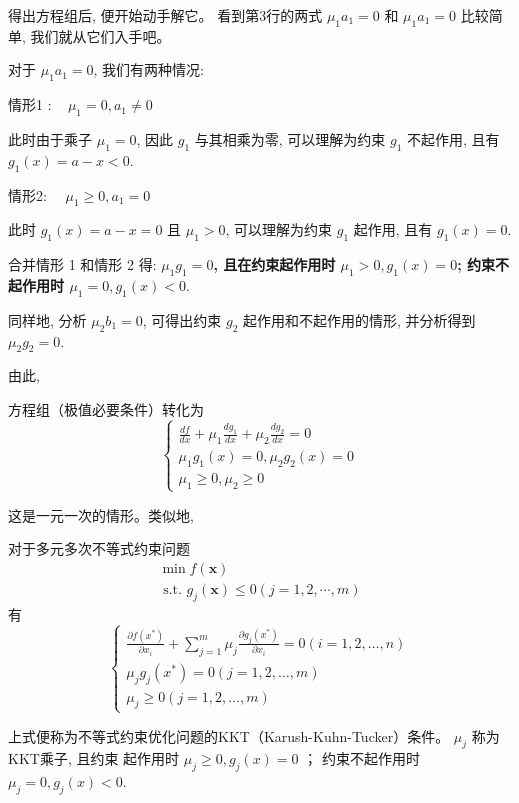 得出方程组后, 便开始动手解它。 看到第3行的两式 $\mu_{1} a_{1}=0$ 和 $\mu_{1} a_{1}=0$ 比较简单, 我们就从它们入手吧。

对于 $\mu_{1} a_{1}=0$, 我们有两种情况:

情形1 $: \quad \mu_{1}=0, a_{1} \neq 0$

此时由于乘子 $\mu_{1}=0$, 因此 $g_{1}$ 与其相乘为零, 可以理解为约束 $g_{1}$ 不起作用, 且有 $g_{1}(x)=a-x<0 .$

情形2: $\quad \mu_{1} \geq 0, a_{1}=0$

此时 $g_{1}(x)=a-x=0$ 且 $\mu_{1}>0$, 可以理解为约束 $g_{1}$ 起作用, 且有 $g_{1}(x)=0$.

合并情形 1 和情形 2 得: \textbf{$\mu_{1} g_{1}=0$, 且在约束起作用时 $\mu_{1}>0, g_{1}(x)=0$; 约束不起作用时 $\mu_{1}=0, g_{1}(x)<0 .$}

同样地, 分析 $\mu_{2} b_{1}=0$, 可得出约束 $g_{2}$ 起作用和不起作用的情形, 并分析得到 $\mu_{2} g_{2}=0$.

由此, 
\begin{theorem}[一元一次优化式的KKT条件]
    方程组（极值必要条件）转化为
$$
\left\{\begin{array}{l}
\frac{d f}{d x}+\mu_{1} \frac{d g_{1}}{d x}+\mu_{2} \frac{d g_{2}}{d x}=0 \\
\mu_{1} g_{1}(x)=0, \mu_{2} g_{2}(x)=0 \\
\mu_{1} \geq 0, \mu_{2} \geq 0
\end{array}\right.
$$

\end{theorem}

 这是一元一次的情形。类似地, 

\begin{corollary}
    对于多元多次不等式约束问题
$$
\begin{array}{l}
\min f(\mathbf{x}) \\
\text { s.t. } g_{j}(\mathbf{x}) \leq 0(j=1,2, \cdots, m)
\end{array}
$$
有
$$
\left\{\begin{array}{l}
\frac{\partial f\left(x^{*}\right)}{\partial x_{i}}+\sum_{j=1}^{m} \mu_{j} \frac{\partial g_{j}\left(x^{*}\right)}{\partial x_{i}}=0(i=1,2, \ldots, n) \\
\mu_{j} g_{j}\left(x^{*}\right)=0(j=1,2, \ldots, m) \\
\mu_{j} \geq 0(j=1,2, \ldots, m)
\end{array}\right.
$$

上式便称为不等式约束优化问题的KKT（Karush-Kuhn-Tucker）条件。 $ \mu_{j} $ 称为KKT乘子, 且约束 起作用时 $ \mu_{j} \geq 0, g_{j}(x)=0 $ ； 约束不起作用时 $ \mu_{j}=0, g_{j}(x)<0 $.
\end{corollary}

